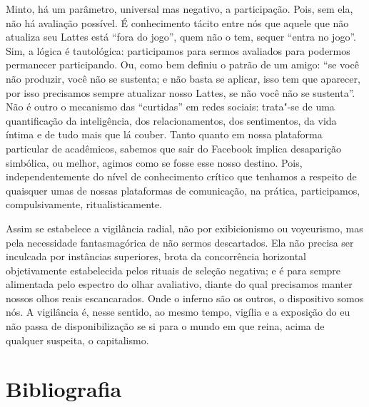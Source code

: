 Minto, há um parâmetro, universal mas negativo, a participação. Pois,
sem ela, não há avaliação possível. É conhecimento tácito entre nós que
aquele que não atualiza seu Lattes está ``fora do jogo'', quem não o
tem, sequer ``entra no jogo''. Sim, a lógica é tautológica: participamos
para sermos avaliados para podermos permanecer participando. Ou, como
bem definiu o patrão de um amigo: ``se você não produzir, você não se
sustenta; e não basta se aplicar, isso tem que aparecer, por isso
precisamos sempre atualizar nosso Lattes, se não você não se sustenta''.
Não é outro o mecanismo das ``curtidas'' em redes sociais: trata"-se de
uma quantificação da inteligência, dos relacionamentos, dos sentimentos,
da vida íntima e de tudo mais que lá couber. Tanto quanto em nossa
plataforma particular de acadêmicos, sabemos que sair do Facebook
implica desaparição simbólica, ou melhor, agimos como se fosse esse
nosso destino. Pois, independentemente do nível de conhecimento crítico
que tenhamos a respeito de quaisquer umas de nossas plataformas de
comunicação, na prática, participamos, compulsivamente,
ritualisticamente.

Assim se estabelece a vigilância radial, não por exibicionismo ou
voyeurismo, mas pela necessidade fantasmagórica de não sermos
descartados. Ela não precisa ser inculcada por instâncias superiores,
brota da concorrência horizontal objetivamente estabelecida pelos
rituais de seleção negativa; e é para sempre alimentada pelo espectro do
olhar avaliativo, diante do qual precisamos manter nossos olhos reais
escancarados. Onde o inferno são os outros, o dispositivo somos nós. A
vigilância é, nesse sentido, ao mesmo tempo, vigília e a exposição do eu
não passa de disponibilização se si para o mundo em que reina, acima de
qualquer suspeita, o capitalismo.

\section{Bibliografia}

